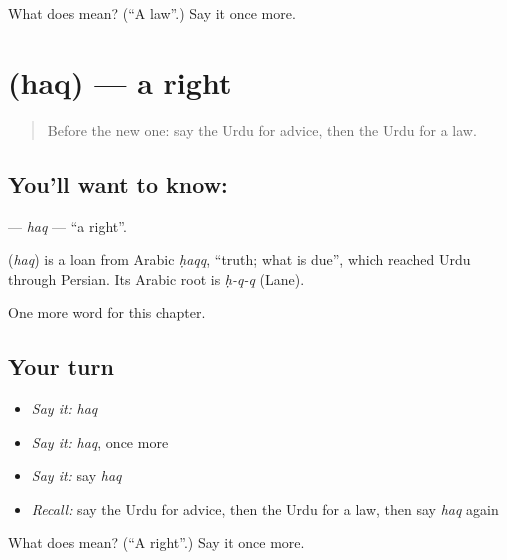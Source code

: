\begin{tcolorbox}[breakable,colback=teal!4,colframe=teal!35!black,title={Before you move on}]
What does  mean? (\textquotedblleft{}A law\textquotedblright{}.) Say it once more.
\end{tcolorbox}
\section[\texorpdfstring{\ur{حق} (haq)}{حق (haq)}]{ (haq) — a right}

\label{lesson:UR-C205-haq}



\begin{quote}
Before the new one: say the Urdu for advice, then the Urdu for a law.
\end{quote}

\subsection*{You'll want to know: }
\textbf{} — \emph{haq} — \textquotedblleft{}a right\textquotedblright{}.

\begin{cousinweb}
\textbf{} (\emph{haq}) is a loan from Arabic \emph{ḥaqq}, \textquotedblleft{}truth; what is due\textquotedblright{}, which reached Urdu through Persian. Its Arabic root is \emph{ḥ-q-q} (Lane).
\end{cousinweb}

\begin{grammarlens}[title={What you've built}]
One more word for this chapter.
\end{grammarlens}

\subsection*{Your turn}
\begin{itemize}
\raggedright
  \item \emph{Say it:} \emph{haq}
  \item \emph{Say it:} \emph{haq}, once more
  \item \emph{Say it:} say \emph{haq}
  \item \emph{Recall:} say the Urdu for advice, then the Urdu for a law, then say \emph{haq} again
\end{itemize}

\begin{tcolorbox}[breakable,colback=teal!4,colframe=teal!35!black,title={Before you move on}]
What does  mean? (\textquotedblleft{}A right\textquotedblright{}.) Say it once more.
\end{tcolorbox}

